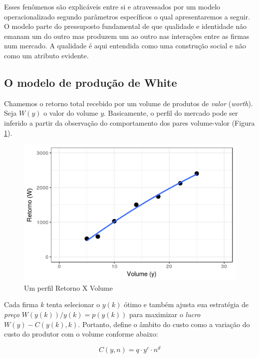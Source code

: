 \documentclass[a4paper, 12pt, openright, oneside, german, french, english, brazil]{abntex2}
\begin{document}
	Esses fenômenos são explicáveis entre si e atravessados por um modelo operacionalizado segundo parâmetros específicos o qual apresentaremos a seguir.	O modelo parte do pressuposto fundamental de que qualidade e identidade não emanam um do outro mas produzem um ao outro nas interações entre as firmas num mercado. A qualidade é aqui entendida como uma construção social e não como um atributo evidente.


	\subsection{O modelo de produção de White}

	Chamemos o retorno total recebido por um volume de produtos de \textit{valor} (\textit{worth}). Seja  $W(y)$ o valor do volume $y$. Basicamente, o perfil do mercado pode ser inferido a partir da observação do comportamento dos pares volume-valor (Figura \ref{white_1.2}).

	\begin{figure}[ht]
		\centering
		\caption{Um perfil Retorno X Volume}
		\label{white_1.2}
		\includegraphics[scale=1]{white_1_2.png}
	\end{figure}

	Cada firma $k$ tenta selecionar o $y(k)$ ótimo e também ajusta sua estratégia de \textit{preço}
	$ W(y(k))/y(k) = p(y(k)) $
	para maximizar o \textit{lucro}
	$ W(y) - C(y(k), k) $. Portanto,  define o âmbito do custo como a variação do custo do produtor com o volume conforme abaixo:
	
	\begin{equation}
	\label{cost}
	C(y, n) = q \cdot y^c \cdot n^d
	\end{equation}
	
\end{document}
